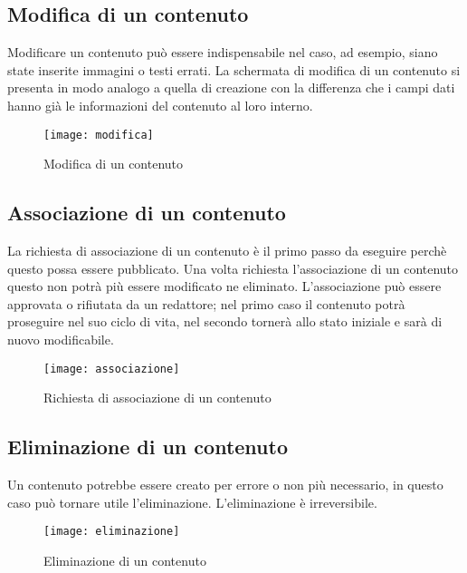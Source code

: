 \subsection{Modifica di un contenuto}
Modificare un contenuto può essere indispensabile nel caso, ad esempio, siano state inserite immagini o testi errati. La schermata di modifica di un contenuto si presenta in modo analogo a quella di creazione con la differenza che i campi dati hanno già le informazioni del contenuto al loro interno.
\begin{figure}[h]
    \begin{center}
    \texttt{[image: modifica]}
    \caption{Modifica di un contenuto}
    \label{fig:figure27}
    \end{center}
\end{figure}
\newpage
\subsection{Associazione di un contenuto}
La richiesta di associazione di un contenuto è il primo passo da eseguire perchè questo possa essere pubblicato. Una volta richiesta l'associazione di un contenuto questo non potrà più essere modificato ne eliminato. L'associazione può essere approvata o rifiutata da un redattore; nel primo caso il contenuto potrà proseguire nel suo ciclo di vita, nel secondo tornerà allo stato iniziale e sarà di nuovo modificabile.
\begin{figure}[h]
    \begin{center}
    \texttt{[image: associazione]}
    \caption{Richiesta di associazione di un contenuto}
    \label{fig:figure28}
    \end{center}
\end{figure}

\subsection{Eliminazione di un contenuto}
Un contenuto potrebbe essere creato per errore o non più necessario, in questo caso può tornare utile l'eliminazione. L'eliminazione è irreversibile.
\begin{figure}[h]
    \begin{center}
    \texttt{[image: eliminazione]}
    \caption{Eliminazione di un contenuto}
    \label{fig:figure29}
    \end{center}
\end{figure}

